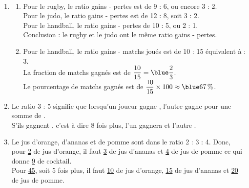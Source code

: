\begin{corrige}
\ \\ [-5mm]
   \begin{enumerate}
      \item 
         \begin{enumerate}
            \item Pour le rugby, le ratio gains - pertes est de 9 : 6, ou encore 3 : 2. \\
               Pour le judo, le ratio gains - pertes est de 12 : 8, soit 3 : 2. \\
               Pour le handball, le ratio gains - pertes de 10 : 5, ou 2 : 1. \\
               Conclusion : {\blue le rugby et le judo ont le même ratio gains - pertes}.
            \item Pour le handball, le ratio gains - matchs joués est de 10 : 15 équivalent à { : 3}. \\ [1mm]
               La fraction de matchs gagnés est de $\dfrac{10}{15} = \blue \dfrac23$. \\ [1.5mm]
               Le pourcentage de matchs gagnés est de $\dfrac{10}{15}\times100 \approx {\blue 67\,\%}$. \smallskip
         \end{enumerate}   
      \setcounter{enumi}{1}
      \item Le ratio 3 : 5 signifie que lorsqu'un joueur gagne , l'autre gagne  pour une somme de . \\
         S'ils gagnent , c'est à dire 8 fois plus, {\blue l'un gagnera  et l'autre }. \\
      \item Le jus d'orange, d'ananas et de pomme sont dans le ratio 2 : 3 : 4. Donc, pour \ul{2} de jus d'orange, il faut \ul{3} de jus d'ananas et \ul{4} de jus de pomme ce qui donne \ul{9} de cocktail. \\
         Pour \ul{45}, soit 5 fois plus, il faut {\blue \ul{10} de jus d'orange, \ul{15} de jus d'ananas et \ul{20} de jus de pomme}.
   \end{enumerate}
\end{corrige}


